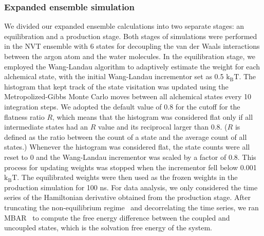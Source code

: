 \documentclass[journal=jacsat,manuscript=article]{achemso}
\begin{document}
\subsubsection{Expanded ensemble simulation}
We divided our expanded ensemble calculations into two separate stages: an equilibration and a production stage. Both stages of simulations were performed in the NVT ensemble with 6 states for decoupling the van der Waals interactions between the argon atom and the water molecules. In the equilibration stage, we employed the Wang-Landau algorithm to adaptively estimate the weight for each alchemical state, with the initial Wang-Landau incrementor set as 0.5 $\text{k}_{\text{B}}\text{T}$. The histogram that kept track of the state visitation was updated using the Metropolized-Gibbs Monte Carlo moves between all alchemical states every 10 integration steps. We adopted the default value of 0.8 for the cutoff for the flatness ratio $R$, which means that the histogram was considered flat only if all intermediate states had an $R$ value and its reciprocal larger than 0.8. ($R$ is defined as the ratio between the count of a state and the average count of all states.) Whenever the histogram was considered flat, the state counts were all reset to 0 and the Wang-Landau incrementor was scaled by a factor of 0.8. This process for updating weights was stopped when the incrementor fell below 0.001 $\text{k}_{\text{B}}\text{T}$. The equilibrated weights were then used as the frozen weights in the production simulation for 100 ns. For data analysis, we only considered the time series of the Hamiltonian derivative obtained from the production stage. After truncating the non-equilibrium regime~\cite{chodera2016simple} and decorrelating the time series, we ran MBAR~\cite{shirts2008statistically} to compute the free energy difference between the coupled and uncoupled states, which is the solvation free energy of the system. 
\end{document}
